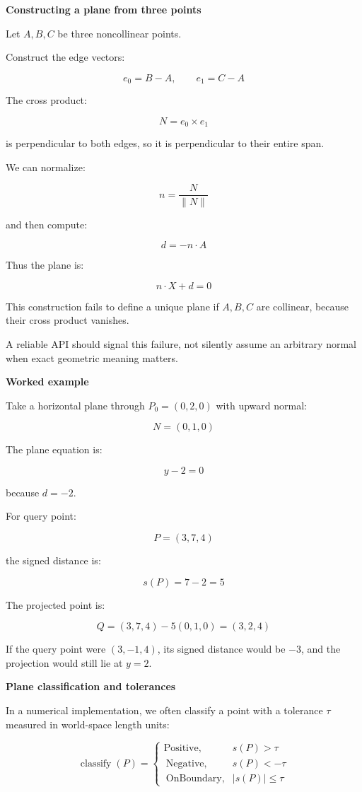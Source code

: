 \textbf{Constructing a plane from three points}

Let \(A,B,C\) be three noncollinear points.

Construct the edge vectors:

\[
e_0=B-A,\qquad e_1=C-A
\]

The cross product:

\[
N=e_0\times e_1
\]

is perpendicular to both edges, so it is perpendicular to their entire span.

We can normalize:

\[
n=\frac{N}{\|N\|}
\]

and then compute:

\[
d=-n\cdot A
\]

Thus the plane is:

\[
n\cdot X+d=0
\]

This construction fails to define a unique plane if \(A,B,C\) are collinear, because their cross product vanishes.

A reliable API should signal this failure, not silently assume an arbitrary normal when exact geometric meaning matters.

\textbf{Worked example}

Take a horizontal plane through \(P_0=(0,2,0)\) with upward normal:

\[
N=(0,1,0)
\]

The plane equation is:

\[
y-2=0
\]

because \(d=-2\).

For query point:

\[
P=(3,7,4)
\]

the signed distance is:

\[
s(P)=7-2=5
\]

The projected point is:

\[
Q=(3,7,4)-5(0,1,0)=(3,2,4)
\]

If the query point were \((3,-1,4)\), its signed distance would be \(-3\), and the projection would still lie at \(y=2\).

\textbf{Plane classification and tolerances}

In a numerical implementation, we often classify a point with a tolerance \(\tau\) measured in world-space length units:

\[
\operatorname{classify}(P)= \begin{cases} \text{Positive}, & s(P)>\tau\\\ \text{Negative}, & s(P)<-\tau\\\ \text{OnBoundary}, & |s(P)|\le\tau \end{cases}
\]

